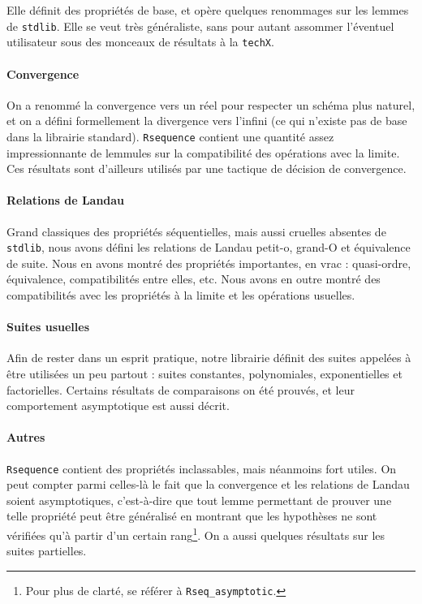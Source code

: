 \documentclass[a4paper,10pt]{article}
\newcommand{\coqcode}[1]{\texttt{#1}}
\begin{document}
Elle définit des propriétés de base, et opère quelques renommages sur les lemmes de \coqcode{stdlib}. Elle se veut très généraliste, sans pour autant assommer l'éventuel utilisateur sous des monceaux de résultats à la \coqcode{techX}.

\paragraph{Convergence} On a renommé la convergence vers un réel pour respecter un schéma plus naturel, et on a défini formellement la divergence vers l'infini (ce qui n'existe pas de base dans la librairie standard). \coqcode{Rsequence} contient une quantité assez impressionnante de lemmules sur la compatibilité des opérations avec la limite. Ces résultats sont d'ailleurs utilisés par une tactique de décision de convergence.

\paragraph{Relations de Landau} Grand classiques des propriétés séquentielles, mais aussi cruelles absentes de \coqcode{stdlib}, nous avons défini les relations de Landau petit-o, grand-O et équivalence de suite. Nous en avons montré des propriétés importantes, en vrac : quasi-ordre, équivalence, compatibilités entre elles, etc. Nous avons en outre montré des compatibilités avec les propriétés à la limite et les opérations usuelles.

\paragraph{Suites usuelles} Afin de rester dans un esprit pratique, notre librairie définit des suites appelées à être utilisées un peu partout : suites constantes, polynomiales, exponentielles et factorielles. Certains résultats de comparaisons on été prouvés, et leur comportement asymptotique est aussi décrit.

\paragraph{Autres} \coqcode{Rsequence} contient des propriétés inclassables, mais néanmoins fort utiles. On peut compter parmi celles-là le fait que la convergence et les relations de Landau soient asymptotiques, c'est-à-dire que tout lemme permettant de prouver une telle propriété peut être généralisé en montrant que les hypothèses ne sont vérifiées qu'à partir d'un certain rang\footnote{Pour plus de clarté, se référer à \coqcode{Rseq\_asymptotic}.}. On a aussi quelques résultats sur les suites partielles.
\end{document}
